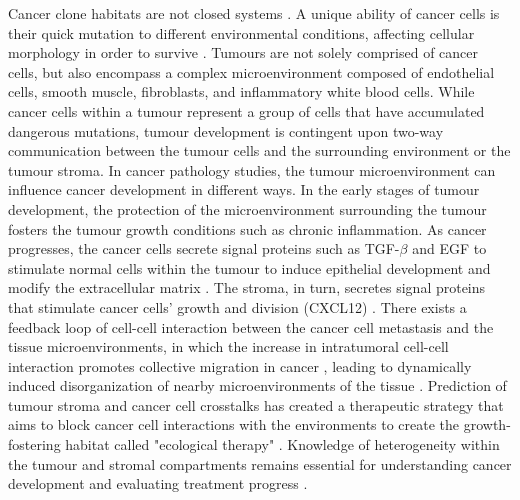 Cancer clone habitats are not closed systems \cite{greaves2012clonal}. A unique ability of cancer cells is their quick mutation to different environmental conditions, affecting cellular morphology in order to survive \cite{clark2015modes}. Tumours are not solely comprised of cancer cells, but also encompass a complex microenvironment composed of endothelial cells, smooth muscle, fibroblasts, and inflammatory white blood cells. While cancer cells within a tumour represent a group of cells that have accumulated dangerous mutations, tumour development is contingent upon two-way communication between the tumour cells and the surrounding environment or the tumour stroma. In cancer pathology studies, the tumour microenvironment can influence cancer development in different ways. In the early stages of tumour development, the protection of the microenvironment surrounding the tumour fosters the tumour growth conditions such as chronic inflammation. As cancer progresses, the cancer cells secrete signal proteins such as TGF-$\beta$ and EGF to stimulate normal cells within the tumour to induce epithelial development and modify the extracellular matrix \cite{beck2011systematic,BREMNES2011209}. The stroma, in turn, secretes signal proteins that stimulate cancer cells' growth and division (\ie CXCL12) \cite{kumar2018analysis,wang2017role}. There exists a feedback loop of cell-cell interaction between the cancer cell metastasis and the tissue microenvironments, in which the increase in intratumoral cell-cell interaction promotes collective migration in cancer \cite{friedl2011cancer, whiteside2008tumor}, leading to dynamically induced disorganization of nearby microenvironments of the tissue \cite{friedl2012classifying, canel2013cadherin, almendro2013cellular, roussos2011chemotaxis, zervantonakis2012three}. Prediction of tumour stroma and cancer cell crosstalks has created a therapeutic strategy that aims to block cancer cell interactions with the environments to create the growth-fostering habitat called "ecological therapy" \cite{pienta2008ecological, calabrese2007perivascular, bissell2011don}. Knowledge of heterogeneity within the tumour and stromal compartments remains essential for understanding cancer development and evaluating treatment progress \cite{pages2010immune}.

